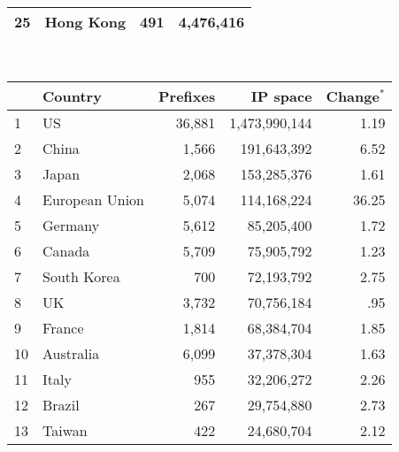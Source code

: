 \begin{table*}[tp]
\begin{minipage}[t]{0.48\textwidth}
\begin{center}
\begin{tabular}{|l||l|r|r|}
25      &       Hong Kong       &       491     &       4,476,416       \tabularnewline
	\hline
	\end{tabular}
	\end{center}
	\ \newline\ \newline
\end{minipage}
%
\quad
%
\begin{minipage}[t]{0.48\textwidth}
	\begin{center}
	\caption{Top 25 countries with the most allocated IP space on \textbf{April 23, 2009}}
	\label{tab:top25 rir ip space 2009}
	\begin{tabular}{|l||l|r|r|r|}
		\hline
		&      \bf Country		& \bf Prefixes  &       \bf IP space 	& \bf Change$^{*}$ 	\tabularnewline \hline 
1       &       US      &       36,881  &       1,473,990,144   &         1.19  \tabularnewline
2       &       China   &       1,566   &       191,643,392     &         6.52  \tabularnewline
3       &       Japan   &       2,068   &       153,285,376     &         1.61  \tabularnewline
4       &       European Union  &       5,074   &       114,168,224     &        36.25  \tabularnewline
5       &       Germany &       5,612   &       85,205,400      &         1.72  \tabularnewline
6       &       Canada  &       5,709   &       75,905,792      &         1.23  \tabularnewline
7       &       South Korea     &       700     &       72,193,792      &         2.75  \tabularnewline
8       &       UK      &       3,732   &       70,756,184      &          .95  \tabularnewline
9       &       France  &       1,814   &       68,384,704      &         1.85  \tabularnewline
10      &       Australia       &       6,099   &       37,378,304      &         1.63  \tabularnewline
11      &       Italy   &       955     &       32,206,272      &         2.26  \tabularnewline
12      &       Brazil  &       267     &       29,754,880      &         2.73  \tabularnewline
13      &       Taiwan  &       422     &       24,680,704      &         2.12  \tabularnewline

\end{tabular}
\end{center}
\end{minipage}
\end{table*}
